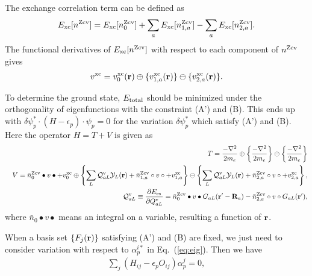 \documentclass[twocolumn,showpacs,preprintnumbers,amsmath,amssymb,floatfix]{revtex4-1}
\newcommand{\bfr}{{\bf r}}
\newcommand{\bfR}{{\bf R}}
\newcommand{\YY}{{\cal Y}}
\newcommand{\ooplus}{\oplus}
\newcommand{\oominus}{\ominus}
\newcommand{\req}[1]{\mbox{Eq.~\!(\ref{#1})}}
\def\EMAXm{ E^{\rm rmesh}_{\rm MAX} }
\def\EMAXm{ E^{\rm rmesh}_{\rm MAX} }
\def\nzcv{n^{\rm Zcv}}
\def\barnzcv{\bar{n}^{\rm Zcv}}
\def\RR{w}
\def\EMAXm{ E^{\rm rmesh}_{\rm MAX} }
\def\EMAXm{ E^{\rm rmesh}_{\rm MAX} }
\def\nzcv{n^{\rm Zcv}}
\def\barnzcv{\bar{n}^{\rm Zcv}}
\def\RR{v}
\begin{document}
\begin{widetext}
The exchange correlation term can be defined as
\begin{eqnarray}
E_{\rm xc}[\nzcv] = E_{\rm xc}[\nzcv_0] 
+  \sum_a E_{\rm xc}[\nzcv_{1,a}]  
-  \sum_a E_{\rm xc}[\nzcv_{2,a}].
\label{eq:exc}
\end{eqnarray}
The functional derivatives of $E_{\rm xc}[\nzcv]$
with respect to each component of $\nzcv$ gives
\begin{eqnarray}
v^{\rm xc} = v^{\rm xc}_0(\bfr)
\ooplus  \{v^{\rm xc}_{1,a}(\bfr)  \}
\oominus \{v^{\rm xc}_{2,a}(\bfr)  \}.
\label{eq:vxc}
\end{eqnarray}

To determine the ground state, 
$E_{\rm total}$ should be minimized under the orthogonality of eigenfunctions with
the constraint (A') and (B).
This ends up with 
$\delta \psi^*_p \cdot (H - \epsilon_p) \cdot \psi_p =0$ for
the variation $\delta \psi^*_p$ which satisfy (A') and (B). 
Here the operator $H=T+V$ is given as
\begin{eqnarray}
&&T=\frac{-\nabla^2 }{2m_e} \oplus \left\{\frac{-\nabla^2 }{2m_e}\right\} 
\ominus \left\{\frac{-\nabla^2 }{2m_e}\right\} \\
&&V= 
\barnzcv_0 \bullet v \bullet + v^{\rm xc}_0
\ooplus
\left\{ \sum_L
{\cal Q}^{\rm v}_{aL} \YY_L(\bfr)
+ \barnzcv_{1,a} \circ \RR \circ + v^{\rm xc}_{1,a} 
\right\} 
\oominus
\left\{ \sum_L
{\cal Q}^{\rm v}_{aL} \YY_L(\bfr)
+ \barnzcv_{2,a} \circ \RR \circ + v^{\rm xc}_{2,a} 
\right\}, \label{eq:v} \\
&&{\cal Q}^{\rm v}_{aL}\equiv \frac{\partial E_{\rm es}}{\partial {Q}^{\rm v}_{aL}} =
\barnzcv_0 \bullet v \bullet G_{aL}(\bfr'-\bfR_a)
-\barnzcv_{2,a} \circ \RR \circ G_{aL}(\bfr'), \label{eq:calqdef}
\end{eqnarray}
where $\bar{n}_0 \bullet v \bullet$ means an integral on a variable, resulting a function of $\bfr$.

When a basis set $\{F_j(\bfr)\}$ satisfying (A') and (B) are fixed, we
just need to consider variation with respect to $\alpha_{p}^{i*}$ in
\req{eq:eig}. Then we have
\begin{eqnarray}
\sum_j (H_{ij} -\epsilon_p O_{ij}) \alpha_p^j =0,
\label{eq:eigenp}
\end{eqnarray}
\end{widetext}
\end{document}
